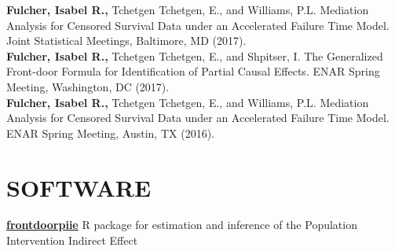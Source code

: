 \documentclass[12pt]{article}
\begin{document}
\textbf{Fulcher, Isabel R.,} Tchetgen Tchetgen, E., and Williams, P.L. Mediation Analysis for Censored Survival Data under an Accelerated Failure Time Model. Joint Statistical Meetings, Baltimore, MD (2017). \\

\textbf{Fulcher, Isabel R.,} Tchetgen Tchetgen, E., and Shpitser, I. The Generalized Front-door Formula for Identification of Partial Causal Effects. ENAR Spring Meeting, Washington, DC (2017). \\

\textbf{Fulcher, Isabel R.,} Tchetgen Tchetgen, E., and Williams, P.L. Mediation Analysis for Censored Survival Data under an Accelerated Failure Time Model. ENAR Spring Meeting, Austin, TX (2016). 


\section*{\textbf{{\Large S}{\small OFTWARE} }}

{\bf \href{https://isabelfulcher.github.io/frontdoorpiie/}{frontdoorpiie}} R package for estimation and inference of the Population Intervention Indirect Effect \\

\end{document}
